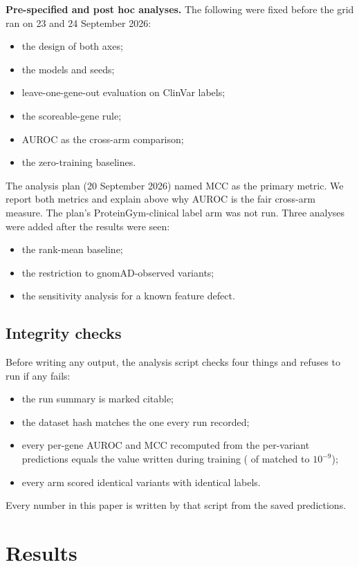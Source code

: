 \documentclass[11pt]{article}
\begin{document}
\textbf{Pre-specified and post hoc analyses.} The following were fixed before the grid
ran on 23 and 24 September 2026:
\begin{itemize}
\item the design of both axes;
\item the models and seeds;
\item leave-one-gene-out evaluation on ClinVar labels;
\item the scoreable-gene rule;
\item AUROC as the cross-arm comparison;
\item the zero-training baselines.
\end{itemize}
The analysis plan (20 September 2026) named MCC as the primary metric. We report both
metrics and explain above why AUROC is the fair cross-arm measure. The plan's
ProteinGym-clinical label arm was not run. Three analyses were added after the results
were seen:
\begin{itemize}
\item the rank-mean baseline;
\item the restriction to gnomAD-observed variants;
\item the sensitivity analysis for a known feature defect.
\end{itemize}

\subsection{Integrity checks}

Before writing any output, the analysis script checks four things and refuses to run if
any fails:
\begin{itemize}
\item the run summary is marked citable;
\item the dataset hash matches the one every run recorded;
\item every per-gene AUROC and MCC recomputed from the per-variant predictions equals the
  value written during training (\nCellsChecked{} of \nCellsChecked{} matched to $10^{-9}$);
\item every arm scored identical variants with identical labels.
\end{itemize}
Every number in this paper is written by that script from the saved predictions.

\section{Results}
\end{document}
